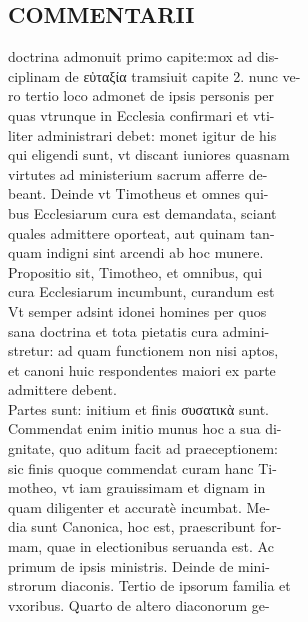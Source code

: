 \documentclass{article}
\begin{document}
\begin{pages}
\section*{COMMENTARII \\
                }doctrina admonuit primo capite:mox ad dis- \\
                ciplinam de εὐταξία tramsiuit capite 2. nunc ve- \\
                ro tertio loco admonet de ipsis personis per \\
                quas vtrunque in Ecclesia confirmari et vti- \\
                liter administrari debet: monet igitur de his \\
                qui eligendi sunt, vt discant iuniores quasnam \\
                virtutes ad ministerium sacrum afferre de- \\
                beant. Deinde vt Timotheus et omnes qui- \\
                bus Ecclesiarum cura est demandata, sciant \\
                quales admittere oporteat, aut quinam tan- \\
                quam indigni sint arcendi ab hoc munere. \\
                Propositio sit, Timotheo, et omnibus, qui \\
                cura Ecclesiarum incumbunt, curandum est \\
                Vt semper adsint idonei homines per quos \\
                sana doctrina et tota pietatis cura admini- \\
                stretur: ad quam functionem non nisi aptos, \\
                et canoni huic respondentes maiori ex parte \\
                admittere debent. \\
                Partes sunt: initium et finis συσατικὰ sunt. \\
                Commendat enim initio munus hoc a sua di- \\
                gnitate, quo aditum facit ad praeceptionem: \\
                sic finis quoque commendat curam hanc Ti- \\
                motheo, vt iam grauissimam et dignam in \\
                quam diligenter et accuratè incumbat. Me- \\
                dia sunt Canonica, hoc est, praescribunt for- \\
                mam, quae in electionibus seruanda est. Ac \\
                primum de ipsis ministris. Deinde de mini- \\
                strorum diaconis. Tertio de ipsorum familia et \\
                vxoribus. Quarto de altero diaconorum ge- \\
                

\end{pages}
\end{document}
